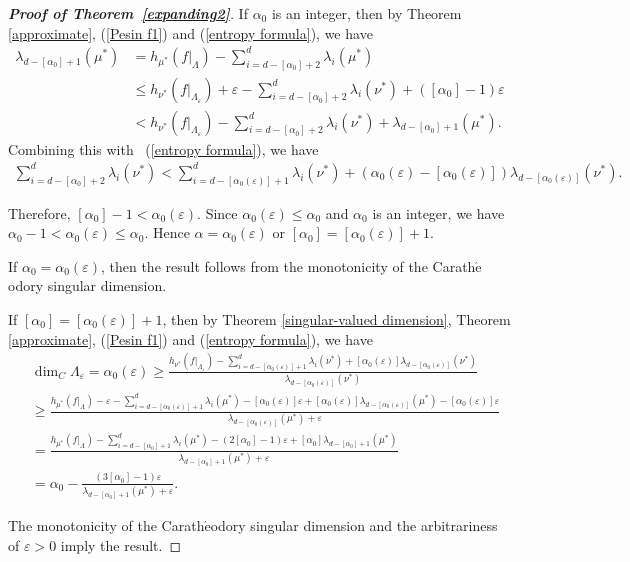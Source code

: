 \documentclass[11pt,a4paper]{amsart}
\theoremstyle{plain}
\theoremstyle{remark}
\begin{document}
\begin{proof}[\textbf{Proof of Theorem~\ref{expanding2}}]
		If $\alpha_{0}$ is  an integer, then by Theorem \ref{approximate}, (\ref{Pesin f1}) and (\ref{entropy formula}), we have
		\begin{align*}
			\lambda_{d-[\alpha_{0}]+1}(\mu^{\ast})&=h_{\mu^{\ast}}(f|_{\Lambda})-\sum^{d}_{i=d-[\alpha_{0}]+2}\lambda_{i}(\mu^{\ast})\\
			&\leq h_{\nu^{\ast}}(f|_{\Lambda_{\varepsilon}})+\varepsilon-\sum^{d}_{i=d-[\alpha_{0}]+2}\lambda_{i}(\nu^{\ast})+([\alpha_{0}]-1)\varepsilon\\
			&< h_{\nu^{\ast}}(f|_{\Lambda_{\varepsilon}})-\sum^{d}_{i=d-[\alpha_{0}]+2}\lambda_{i}(\nu^{\ast})+\lambda_{d-[\alpha_{0}]+1}(\mu^{\ast}).
		\end{align*}
		Combining this with ~(\ref{entropy formula}), we have 
		\begin{align*}
			\sum^{d}_{i=d-[\alpha_{0}]+2}\lambda_{i}(\nu^{\ast})<\sum^{d}_{i=d-[\alpha_{0}(\varepsilon)]+1}\lambda_{i}(\nu^{\ast})+(\alpha_{0}(\varepsilon)-[\alpha_{0}(\varepsilon)])\lambda_{d-[\alpha_{0}(\varepsilon)]}(\nu^{\ast}).
		\end{align*}
		
		Therefore, $[\alpha_{0}]-1< \alpha_{0}(\varepsilon)$. Since $\alpha_0(\varepsilon)\leq \alpha_0$ and $\alpha_{0}$ is  an integer, we have $\alpha_0-1<\alpha_0(\varepsilon)\leq \alpha_0$. Hence $\alpha=\alpha_{0}(\varepsilon)$ or $[\alpha_{0}]= [\alpha_{0}(\varepsilon)]+1$.
		
		If $\alpha_{0}=\alpha_{0}(\varepsilon)$, then the result follows from the monotonicity of the Carath$\acute{\text{e}}$odory singular dimension.
		
		If $[\alpha_{0}]=[\alpha_{0}(\varepsilon)]+1$, then by Theorem \ref{singular-valued dimension},  Theorem \ref{approximate}, (\ref{Pesin f1}) and (\ref{entropy formula}), we have
		\begin{align*}
			&\dim_{C}\Lambda_{\varepsilon}=\alpha_{0}(\varepsilon)\geq\frac{h_{\nu^{\ast}}(f|_{\Lambda_{\varepsilon}})-\sum^{d}_{i=d-[\alpha_{0}(\varepsilon)]+1}\lambda_{i}(\nu^{\ast})+[\alpha_{0}(\varepsilon)]\lambda_{d-[\alpha_{0}(\varepsilon)]}(\nu^{\ast})}{\lambda_{d-[\alpha_{0}(\varepsilon)]}(\nu^{\ast})}\\
			&\geq\frac{h_{\mu^{\ast}}(f|_{\Lambda})-\varepsilon-\sum^{d}_{i=d-[\alpha_{0}(\varepsilon)]+1}\lambda_{i}(\mu^{\ast})-[\alpha_{0}(\varepsilon)]\varepsilon+[\alpha_{0}(\varepsilon)]\lambda_{d-[\alpha_{0}(\varepsilon)]}(\mu^{\ast})-[\alpha_{0}(\varepsilon)]\varepsilon}{\lambda_{d-[\alpha_{0}(\varepsilon)]}(\mu^{\ast})+\varepsilon}\\
			&=\frac{h_{\mu^{\ast}}(f|_{\Lambda})-\sum^{d}_{i=d-[\alpha_{0}]+1}\lambda_{i}(\mu^{\ast})-(2[\alpha_{0}]-1)\varepsilon+[\alpha_{0}]\lambda_{d-[\alpha_{0}]+1}(\mu^{\ast})}{\lambda_{d-[\alpha_{0}]+1}(\mu^{\ast})+\varepsilon}\\ &=\alpha_{0}-\frac{(3[\alpha_{0}]-1)\varepsilon}{\lambda_{d-[\alpha_{0}]+1}(\mu^{\ast})+\varepsilon}.
		\end{align*}
		
		The monotonicity of the Carath$\acute{\text{e}}$odory singular dimension and the arbitrariness of  $\varepsilon>0$ imply the result.
	\end{proof}
\end{document}
